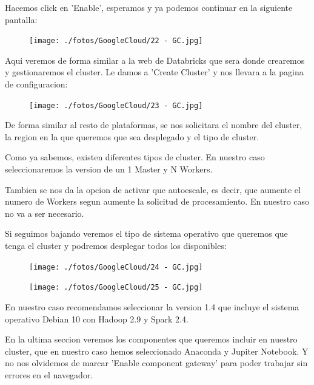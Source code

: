 \documentclass[a4paper,10pt]{article}
\begin{document}
Hacemos click en 'Enable', esperamos y ya podemos continuar en la siguiente pantalla:

\begin{figure}[H]
\begin{center}
\texttt{[image: ./fotos/GoogleCloud/22 - GC.jpg]}
\end{center}
\end{figure}

Aqui veremos de forma similar a la web de Databricks que sera donde crearemos y gestionaremos el cluster. Le damos a 'Create Cluster' y nos llevara a la pagina de configuracion:

\begin{figure}[H]
\begin{center}
\texttt{[image: ./fotos/GoogleCloud/23 - GC.jpg]}
\end{center}
\end{figure}

De forma similar al resto de plataformas, se nos solicitara el nombre del cluster, la region en la que queremos que sea desplegado y el tipo de cluster. 

Como ya sabemos, existen diferentes tipos de cluster. En nuestro caso seleccionaremos la version de un 1 Master y N Workers. 

Tambien se nos da la opcion de activar que autoescale, es decir, que aumente el numero de Workers segun aumente la solicitud de procesamiento. En nuestro caso no va a ser necesario.

Si seguimos bajando veremos el tipo de sistema operativo que queremos que tenga el cluster y podremos desplegar todos los disponibles:

\begin{figure}[H]
\begin{center}
\texttt{[image: ./fotos/GoogleCloud/24 - GC.jpg]}
\end{center}
\end{figure}

\begin{figure}[H]
\begin{center}
\texttt{[image: ./fotos/GoogleCloud/25 - GC.jpg]}
\end{center}
\end{figure}

En nuestro caso recomendamos seleccionar la version 1.4 que incluye el sistema operativo Debian 10 con Hadoop 2.9 y Spark 2.4.

En la ultima seccion veremos los componentes que queremos incluir en nuestro cluster, que en nuestro caso hemos seleccionado Anaconda y Jupiter Notebook. Y no nos olvidemos de marcar 'Enable component gateway' para poder trabajar sin errores en el navegador.
\end{document}
